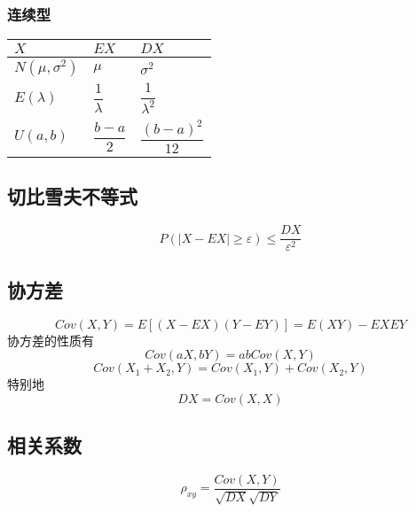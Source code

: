 \subsubsection{连续型}

\begin{table}[H]
  \renewcommand\arraystretch{2}
  \begin{tabular}{|l|l|l|}
    \hline
    $X$&$EX$&$DX$\\
    \hline
    $N(\mu,\sigma^{2})$&$\mu$&$\sigma^{2}$\\
    \hline
    $E(\lambda)$&$\dfrac{1}{\lambda}$&$\dfrac{1}{\lambda^{2}}$\\
    \hline
    $U(a,b)$&$\dfrac{b-a}{2}$&$\dfrac{(b-a)^{2}}{12}$\\
    \hline
  \end{tabular}
\end{table}

\subsection{切比雪夫不等式}

\begin{equation}
  \label{eq:9519029192103210}
  P \left( |X-EX| \geq \varepsilon \right) \leq \dfrac{DX}{\varepsilon^{2}}
\end{equation}

\subsection{协方差}

\begin{equation*}
  Cov(X,Y)=E \left[ \left( X-EX \right) \left( Y-EY \right) \right] = E \left( XY \right) -EXEY
\end{equation*}
协方差的性质有
\begin{equation*}
  Cov(aX,bY)=ab Cov(X,Y)
\end{equation*}
\begin{equation*}
  Cov(X_{1}+X_{2} ,Y) = Cov(X_{1},Y) + Cov(X_{2},Y)
\end{equation*}
特别地
\begin{equation*}
  DX=Cov(X,X)
\end{equation*}

\subsection{相关系数}

\begin{equation*}
  \rho_{xy} = \dfrac{Cov(X,Y)}{\sqrt{DX} \sqrt{DY}}
\end{equation*}

